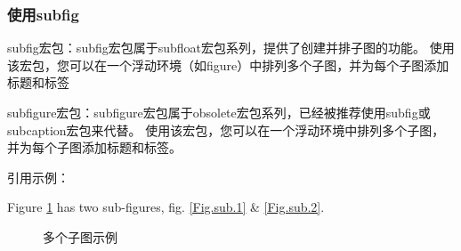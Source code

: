 \subsubsection{使用{subfig}}

subfig宏包：subfig宏包属于subfloat宏包系列，提供了创建并排子图的功能。
使用该宏包，您可以在一个浮动环境（如figure）中排列多个子图，并为每个子图添加标题和标签


subfigure宏包：subfigure宏包属于obsolete宏包系列，已经被推荐使用subfig或subcaption宏包来代替。
使用该宏包，您可以在一个浮动环境中排列多个子图，并为每个子图添加标题和标签。

引用示例：

Figure \ref{fig:subfig-example} has two sub-figures, fig. \ref{Fig.sub.1} \& \ref{Fig.sub.2}.

\begin{figure}
    \centering
    \hfill
    \caption{多个子图示例}
    \label{fig:subfig-example}
\end{figure}


